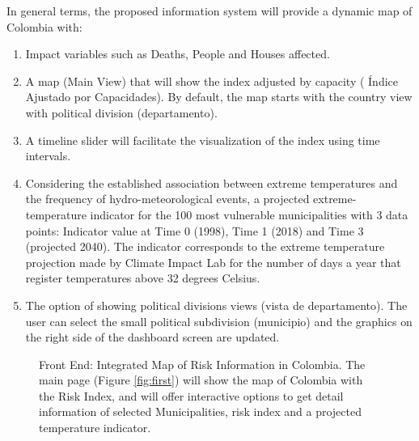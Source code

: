 In general terms, the proposed information system will provide a dynamic map of Colombia with:

\begin{enumerate}
\item Impact variables such as Deaths, People and Houses affected.
\item A map (Main View) that will show the index adjusted by capacity ( \'Indice Ajustado por Capacidades). By default, the map starts with the country view with political division (departamento).
\item A timeline slider will facilitate the visualization of the index using time intervals. 
\item Considering the established association between extreme temperatures and the frequency of hydro-meteorological events, a projected extreme-temperature indicator for the 100 most vulnerable municipalities with 3 data points: Indicator value at Time 0 (1998), Time 1 (2018) and Time 3 (projected 2040). The indicator corresponds to the extreme temperature projection made by Climate Impact Lab for the number of days a year that register temperatures above 32 degrees Celsius.

\item The option of showing political divisions views (vista de departamento). The user can select the small political subdivision (municipio) and the graphics on the right side of the dashboard screen are updated.
\end{enumerate}




\begin{figure}%
\centering
{}%
\qquad
{}%
\caption{Front End: Integrated Map of Risk Information in Colombia. The main page (Figure \ref{fig:first}) will show the map of Colombia with the Risk Index, and will offer interactive options to get detail information of selected Municipalities, risk index and a projected temperature indicator.}
\label{fig:muckup}%
\end{figure}

